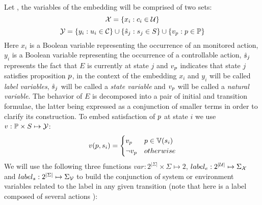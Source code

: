 %
Let \cltsDef, the variables of the embedding will be comprised of two sets:
\[{\mathcal{X}} = \{x_i : c_i \in \mathcal{U} \}\]
\[{\mathcal{Y}} = \{y_i : u_i \in \mathcal{C} \} \cup \{\hat{s}_{j} : s_j \in S \} \cup \{v_{p} : p \in \mathbb{P}\}\]
Here $x_i$ is a Boolean variable representing the occurrence of an monitored action, $y_i$ is a Boolean variable representing the occurrence of a controllable action, $\hat{s}_{j}$ represents the fact that $E$ is currently at state $j$ and $v_{p}$ indicates that state $j$ satisfies proposition $p$,  in the context of the embedding $x_i$ and $y_i$ will be called \emph{label variables}, $\hat{s}_{j}$ will be called a \emph{state variable} and $v_{p}$ will be called a \emph{natural variable}.
The behavior of $E$ is decomposed into a pair of initial and transition formulae, the latter being expressed as a conjunction of smaller terms in order to clarify its construction.
To embed satisfaction of $p$ at state $i$ we use $v:\mathbb{P} \times S \mapsto {\mathcal{Y}}$:
\[
v(p,s_i) = \begin{cases}
v_{p} & p \in \mathbb{V}(s_i) \\
\neg v_{p} & otherwise
\end{cases}
\]
We will use the following three functions $var:2^{|\Sigma|}\times \Sigma \mapsto 2$, $label_e:2^{|\mathcal{U}|}\mapsto \Sigma_{{\mathcal{X}}}$ and $label_s:2^{|\Sigma|}\mapsto \Sigma_{{\mathcal{V}}}$ to build the conjunction of system or environment variables related to the label in any given transition (note that here \actionLabel is a label composed of several actions \action):
